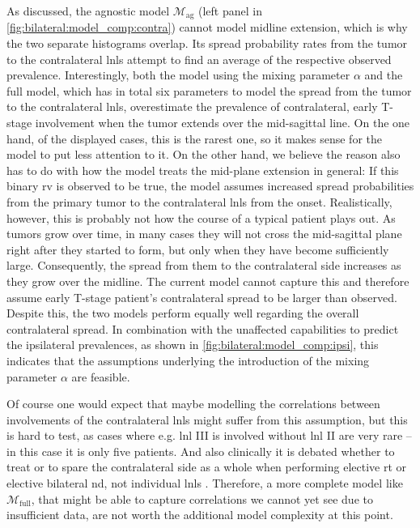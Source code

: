 \documentclass[\relativeRoot/main.tex]{subfiles}
\begin{document}
As discussed, the agnostic model $\mathcal{M}_\text{ag}$ (left panel in \cref{fig:bilateral:model_comp:contra}) cannot model midline extension, which is why the two separate histograms overlap. Its spread probability rates from the tumor to the contralateral \glspl{lnl} attempt to find an average of the respective observed prevalence. Interestingly, both the model using the mixing parameter $\alpha$ and the full model, which has in total six parameters to model the spread from the tumor to the contralateral \glspl{lnl}, overestimate the prevalence of contralateral, early T-stage involvement when the tumor extends over the mid-sagittal line. On the one hand, of the displayed cases, this is the rarest one, so it makes sense for the model to put less attention to it. On the other hand, we believe the reason also has to do with how the model treats the mid-plane extension in general: If this binary \gls{rv} is observed to be true, the model assumes increased spread probabilities from the primary tumor to the contralateral \glspl{lnl} from the onset. Realistically, however, this is probably not how the course of a typical patient plays out. As tumors grow over time, in many cases they will not cross the mid-sagittal plane right after they started to form, but only when they have become sufficiently large. Consequently, the spread from them to the contralateral side increases as they grow over the midline. The current model cannot capture this and therefore assume early T-stage patient's contralateral spread to be larger than observed. Despite this, the two models perform equally well regarding the overall contralateral spread. In combination with the unaffected capabilities to predict the ipsilateral prevalences, as shown in \cref{fig:bilateral:model_comp:ipsi}, this indicates that the assumptions underlying the introduction of the mixing parameter $\alpha$ are feasible.

Of course one would expect that maybe modelling the correlations between involvements of the contralateral \glspl{lnl} might suffer from this assumption, but this is hard to test, as cases where e.g. \gls{lnl} III is involved without \gls{lnl} II are very rare -- in this case it is only five patients. And also clinically it is debated whether to treat or to spare the contralateral side as a whole when performing elective \gls{rt} or elective bilateral \gls{nd}, not individual \glspl{lnl} \cite{biau_selection_2019,al-mamgani_contralateral_2017}. Therefore, a more complete model like $\mathcal{M}_\text{full}$, that might be able to capture correlations we cannot yet see due to insufficient data, are not worth the additional model complexity at this point.
\end{document}
